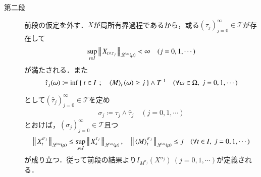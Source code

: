 \begin{prf}
\begin{description}
			\item[第二段]
				前段の仮定を外す．$X$が局所有界過程であるから，或る$(\tau_j)_{j=0}^{\infty} \in \mathcal{T}$が存在して
				\begin{align}
					\operatorname*{sup}_{t \in I} \left\|\, X_{t \wedge \tau_j}\, \right\|_{\mathscr{L}^{\infty} \left(\mu\right)} < \infty
					\quad (j=0,1,\cdots)
				\end{align}
				が満たされる．また
				\begin{align}
					\hat{\tau}_j(\omega) \coloneqq
					\inf{}{\Set{t \in I}{\inprod<M>_t(\omega) \geq j}} \wedge T\ \footnotemark
					\quad (\forall \omega \in \Omega,\ j=0,1,\cdots)
				\end{align}
				として$\left( \hat{\tau}_j \right)_{j=0}^{\infty} \in \mathcal{T}$を定め
				\begin{align}
					\sigma_j \coloneqq \tau_j \wedge \hat{\tau}_j
					\quad (j=0,1,\cdots)
					\label{eq:Ito-Integral_on_M_c_loc_stopping_time}
				\end{align}
				とおけば，$(\sigma_j)_{j=0}^{\infty} \in \mathcal{T}$且つ
				\begin{align}
					\Norm{X^{\sigma_j}_t}{\semiLp{\infty}{\mu}} \leq \sup{s \in I}{\Norm{X^{\tau_j}_s}{\semiLp{\infty}{\mu}}},
					\quad \Norm{\inprod<M>^{\sigma_j}_t}{\semiLp{\infty}{\mu}} \leq j
					\quad (\forall t \in I,\ j=0,1,\cdots)
				\end{align}
				が成り立つ．従って前段の結果より$I_{M^{\sigma_j}}(X^{\sigma_j})\ (j=0,1,\cdots)$が定義される．
				

\end{description}
\end{prf}
